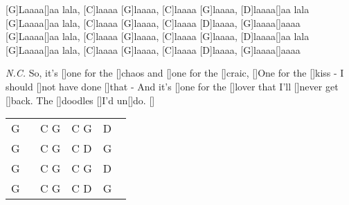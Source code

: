 \begin{guitar}
	[G]Laaaa[]aa lala, [C]laaaa [G]laaaa, [C]laaaa [G]laaaa, [D]laaaa[]aa lala
	[G]Laaaa[]aa lala, [C]laaaa [G]laaaa, [C]laaaa [D]laaaa, [G]laaaa[]aaaa
	[G]Laaaa[]aa lala, [C]laaaa [G]laaaa, [C]laaaa [G]laaaa, [D]laaaa[]aa lala
	[G]Laaaa[]aa lala, [C]laaaa [G]laaaa, [C]laaaa [D]laaaa, [G]laaaa[]aaaa
	
	 {\footnotesize\textit{N.C.}}
	So, it's []one for the []chaos and []one for the []craic,
	[]One for the []kiss - I should []not have done []that -
	And it's []one for the []lover that I'll []never get []back. 
	The []doodles []I'd un[]do. []{}
	
	{\footnotesize\begin{tabular}{|l|l|l|l|}
			G ~ & C G & C G & D ~ \\
			G & C G & C D & G \\
			G & C G & C G & D \\
			G & C G & C D & G 
	\end{tabular}}
	
	\begin{highlightbar}
	\end{highlightbar}
\end{guitar}